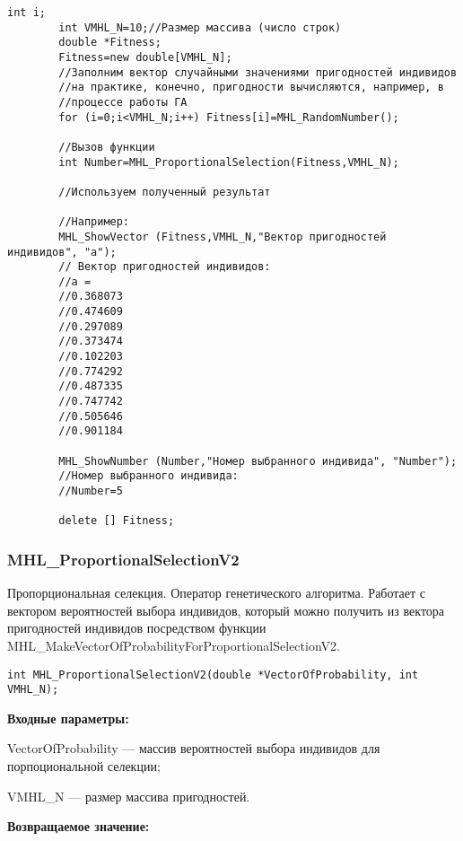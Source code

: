 \documentclass[a4paper,12pt]{article}
\begin{document}
\begin{lstlisting}[label=code_use_MHL_ProportionalSelection,caption=Пример использования]
        int i;
        int VMHL_N=10;//Размер массива (число строк)
        double *Fitness;
        Fitness=new double[VMHL_N];
        //Заполним вектор случайными значениями пригодностей индивидов
        //на практике, конечно, пригодности вычисляются, например, в
        //процессе работы ГА
        for (i=0;i<VMHL_N;i++) Fitness[i]=MHL_RandomNumber();

        //Вызов функции
        int Number=MHL_ProportionalSelection(Fitness,VMHL_N);

        //Используем полученный результат

        //Например:
        MHL_ShowVector (Fitness,VMHL_N,"Вектор пригодностей индивидов", "a");
        // Вектор пригодностей индивидов:
        //a =
        //0.368073
        //0.474609
        //0.297089
        //0.373474
        //0.102203
        //0.774292
        //0.487335
        //0.747742
        //0.505646
        //0.901184

        MHL_ShowNumber (Number,"Номер выбранного индивида", "Number");
        //Номер выбранного индивида:
        //Number=5

        delete [] Fitness;
\end{lstlisting}

\subsubsection{MHL\_ProportionalSelectionV2}\label{MHL_ProportionalSelectionV2}

Пропорциональная селекция. Оператор генетического алгоритма. Работает с вектором вероятностей выбора индивидов, который можно получить из вектора пригодностей индивидов посредством функции MHL\_MakeVectorOfProbabilityForProportionalSelectionV2.


\begin{lstlisting}[label=code_syntax_MHL_ProportionalSelectionV2,caption=Синтаксис]
int MHL_ProportionalSelectionV2(double *VectorOfProbability, int VMHL_N);
\end{lstlisting}

\textbf{Входные параметры:}
 
 VectorOfProbability --- массив вероятностей выбора индивидов для порпоциональной селекции;
 
 VMHL\_N --- размер массива пригодностей.

\textbf{Возвращаемое значение:} 
\end{document}
